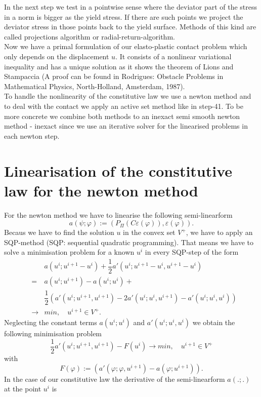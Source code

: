 \documentclass{article}
\begin{document}
In the next step we test in a pointwise sense where the deviator part of the stress in a norm is bigger as the yield stress.
If there are such points we project the deviator stress in those points back to the yield surface. Methods of this kind
are called projections algorithm or radial-return-algorithm.\\
Now we have a primal formulation of our elasto-plastic contact problem which only depends on the displacement $u$.
It consists of a nonlinear variational inequality and has a unique solution as it shows the theorem of Lions and Stampaccia 
(A proof can be found in Rodrigues: Obstacle Problems in Mathematical Physics, North-Holland, Amsterdam, 1987).\\
To handle the nonlinearity of the constitutive law we use a newton method and to deal with the contact we apply an
active set method like in step-41. To be more concrete we combine both methods to an inexact semi smooth newton
method - inexact since we use an iterative solver for the linearised problems in each newton step.

\section{Linearisation of the constitutive law for the newton method}

For the newton method we have to linearise the following semi-linearform
$$a(\psi;\varphi) := \left(P_{\Pi}(C\varepsilon(\varphi)),\varepsilon(\varphi)\right).$$
Becaus we have to find the solution $u$ in the convex set $V^+$, we have to apply an SQP-method (SQP: sequential quadratic
programming). That means we have to solve a minimisation problem for a known $u^i$ in every SQP-step of the form
\begin{eqnarray*}
 & & a(u^{i};u^{i+1} - u^i) + \dfrac{1}{2}a'(u^i;u^{i+1} - u^i,u^{i+1} - u^i)\\
 &=&  a(u^i;u^{i+1}) -  a(u^i;u^i) +\\
 & & \dfrac{1}{2}\left( a'(u^i;u^{i+1},u^{i+1}) - 2a'(u^i;u^i,u^{i+1}) - a'(u^i;u^i,u^i)\right)\\
 &\rightarrow& min,\quad u^{i+1}\in V^+.
\end{eqnarray*}
Neglecting the constant terms $ a(u^i;u^i)$ and $ a'(u^i;u^i,u^i)$ we obtain the following minimisation problem
$$\dfrac{1}{2} a'(u^i;u^{i+1},u^{i+1}) - F(u^i)\rightarrow min,\quad u^{i+1}\in V^+$$
with
$$F(\varphi) := \left(a'(\varphi;\varphi,u^{i+1}) -  a(\varphi;u^{i+1}) \right).$$
In the case of our constitutive law the derivative of the semi-linearform $a(.;.)$ at the point $u^i$ is
\end{document}
